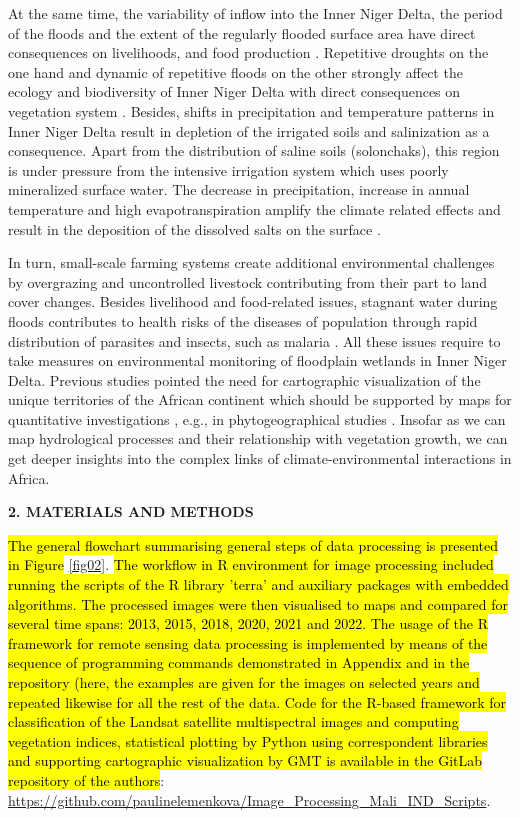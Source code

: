 \documentclass[12pt,a4paper,oneside]{article}
\def \newsection{\vspace{12pt}\textbf}
\def \newpar{\vspace{6pt}}
\begin{document}
\newpar At the same time, the variability of inflow into the Inner Niger Delta, the period of the floods and the extent of the regularly flooded surface area have direct consequences on livelihoods, and food production \citep{LIERSCH201318}. Repetitive droughts on the one hand and dynamic of repetitive floods on the other strongly affect the ecology and biodiversity of Inner Niger Delta with direct consequences on vegetation system \citep{mariko2003caracterisation}. Besides, shifts in precipitation and temperature patterns in Inner Niger Delta result in depletion of the irrigated soils and salinization as a consequence. Apart from the distribution of saline soils (solonchaks), this region is under pressure from the intensive irrigation system which uses poorly mineralized surface water. The decrease in precipitation, increase in annual temperature and high evapotranspiration amplify the climate related effects and result in the deposition of the dissolved salts on the surface \citep{Valenza}. 

\newpar In turn, small-scale farming systems create additional environmental challenges by overgrazing and uncontrolled livestock contributing from their part to land cover changes. Besides livelihood and food-related issues, stagnant water during floods contributes to health risks of the diseases of population through rapid distribution of parasites and insects, such as malaria \citep{COOLS201334,Klinkenberg}. All these issues require to take measures on environmental monitoring of floodplain wetlands in Inner Niger Delta. Previous studies pointed the need for cartographic visualization of the unique territories of the African continent which should be supported by maps for quantitative investigations \citep{Cabot1968}, e.g., in phytogeographical studies \citep{Robequain}. Insofar as we can map hydrological processes and their relationship with vegetation growth, we can get deeper insights into the complex links of climate-environmental interactions in Africa.

\newsection {2. MATERIALS AND METHODS}

\hl{The general flowchart summarising general steps of data processing is presented in Figure} \ref{fig02}. \hl{The workflow in R environment for image processing included running the scripts of the R library 'terra' and auxiliary packages with embedded algorithms. The processed images were then visualised to maps and compared for several time spans: 2013, 2015, 2018, 2020, 2021 and 2022. The usage of the R framework for remote sensing data processing is implemented by means of the sequence of programming commands demonstrated in Appendix and in the repository (here, the examples are given for the images on selected years and repeated likewise for all the rest of the data. Code for the R-based framework for classification of the Landsat satellite multispectral images and computing vegetation indices, statistical plotting by Python using correspondent libraries and supporting cartographic visualization by GMT is available in the GitLab repository of the authors}: \href{https://github.com/paulinelemenkova/Image_Processing_Mali_IND_Scripts}{https://github.com/paulinelemenkova/Image\_Processing\_Mali\_IND\_Scripts}.
\end{document}
